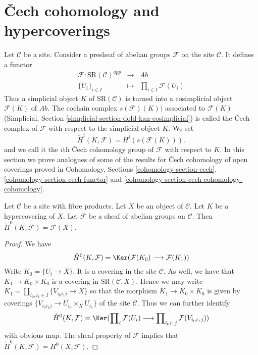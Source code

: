 \section{{\v C}ech cohomology and hypercoverings}
\label{section-hyper-cech}

\noindent
Let $\mathcal{C}$ be a site. Consider a presheaf of
abelian groups $\mathcal{F}$ on the site $\mathcal{C}$.
It defines a functor
\begin{eqnarray*}
\mathcal{F} : \text{SR}(\mathcal{C})^{opp}
& \longrightarrow &
\textit{Ab} \\
\{U_i\}_{i \in I} &
\longmapsto &
\prod\nolimits_{i \in I} \mathcal{F}(U_i)
\end{eqnarray*}
Thus a simplicial object $K$ of $\text{SR}(\mathcal{C})$
is turned into a cosimplicial object $\mathcal{F}(K)$ of $\textit{Ab}$.
The cochain complex $s(\mathcal{F})(K))$ associated to $\mathcal{F}(K)$
(Simplicial, Section
\ref{simplicial-section-dold-kan-cosimplicial})
is called the {\v C}ech complex of $\mathcal{F}$ with
respect to the simplicial object $K$. We set
$$
\check{H}^i(K, \mathcal{F})
=
H^i(s(\mathcal{F}(K))).
$$
and we call it the $i$th {\v C}ech cohomology group
of $\mathcal{F}$ with respect to $K$.
In this section we prove analogues of some of the results for
{\v C}ech cohomology of open coverings proved in
Cohomology, Sections \ref{cohomology-section-cech},
\ref{cohomology-section-cech-functor} and
\ref{cohomology-section-cech-cohomology-cohomology}.

\begin{lemma}
\label{lemma-h0-cech}
Let $\mathcal{C}$ be a site with fibre products.
Let $X$ be an object of $\mathcal{C}$.
Let $K$ be a hypercovering of $X$.
Let $\mathcal{F}$ be a sheaf of abelian groups on $\mathcal{C}$.
Then $\check{H}^0(K, \mathcal{F}) = \mathcal{F}(X)$.
\end{lemma}

\begin{proof}
We have
$$
\check{H}^0(K, \mathcal{F})
=
\Ker(\mathcal{F}(K_0) \longrightarrow \mathcal{F}(K_1))
$$
Write $K_0 = \{U_i \to X\}$. It is a covering in the site
$\mathcal{C}$. As well, we have that $K_1 \to K_0 \times K_0$
is a covering in $\text{SR}(\mathcal{C}, X)$. Hence we may
write $K_1 = \amalg_{i_0, i_1 \in I} \{V_{i_0i_1j} \to X\}$
so that the morphism $K_1 \to K_0 \times K_0$ is given
by coverings $\{V_{i_0i_1j} \to U_{i_0} \times_X U_{i_1}\}$
of the site $\mathcal{C}$. Thus we can further identify
$$
\check{H}^0(K, \mathcal{F})
=
\Ker(
\prod\nolimits_i \mathcal{F}(U_i)
\longrightarrow
\prod\nolimits_{i_0i_1 j} \mathcal{F}(V_{i_0i_1j})
)
$$
with obvious map. The sheaf property of $\mathcal{F}$
implies that $\check{H}^0(K, \mathcal{F}) = H^0(X, \mathcal{F})$.
\end{proof}

